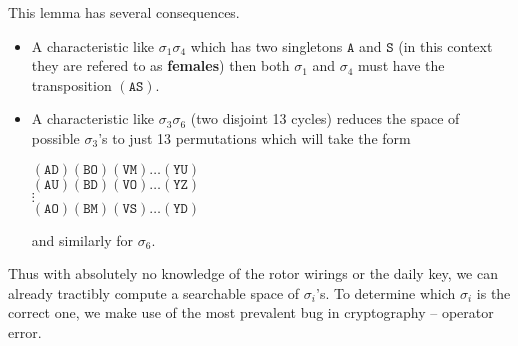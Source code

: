 This lemma has several consequences.
\begin{itemize}
	\item A characteristic like $\sigma_1\sigma_4$ which has two singletons $\texttt{A}$ and $\texttt{S}$ (in this context they are refered to as {\bf{females}}) then both $\sigma_1$ and $\sigma_4$ must have the transposition $(\texttt{AS})$.
	\item A characteristic like $\sigma_3\sigma_6$ (two disjoint 13 cycles) reduces the space of possible $\sigma_3$'s to just 13 permutations which will take the form
	      \begin{center}
		      $(\texttt{AD})(\texttt{BO})(\texttt{VM})\dots(\texttt{YU})$ \\
		      $(\texttt{AU})(\texttt{BD})(\texttt{VO})\dots(\texttt{YZ})$ \\
		      $\vdots$                                       \\
		      $(\texttt{AO})(\texttt{BM})(\texttt{VS})\dots(\texttt{YD})$
	      \end{center}
	      and similarly for $\sigma_6$.
\end{itemize}
Thus with absolutely no knowledge of the rotor wirings or the daily key, we can already tractibly compute a searchable space of $\sigma_i$'s. To determine which $\sigma_i$ is the correct one, we make use of the most prevalent bug in cryptography -- operator error.

